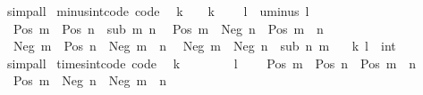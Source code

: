 \begin{isabellebody}
\isamarkupfalse%
\ simp{\isacharunderscore}{\kern0pt}all%
\endisatagproof
{\isafoldproof}%
%
\isadelimproof
\isanewline
%
\endisadelimproof
\isanewline
{}\isamarkupfalse%
\ minus{\isacharunderscore}{\kern0pt}int{\isacharunderscore}{\kern0pt}code\ {\isacharbrackleft}{\kern0pt}code{\isacharbrackright}{\kern0pt}{\isacharcolon}{\kern0pt}\isanewline
\ \ {\isachardoublequoteopen}k\ {\isacharminus}{\kern0pt}\ {}\ {\isacharequal}{\kern0pt}\ k{\isachardoublequoteclose}\isanewline
\ \ {\isachardoublequoteopen}{}\ {\isacharminus}{\kern0pt}\ l\ {\isacharequal}{\kern0pt}\ uminus\ l{\isachardoublequoteclose}\isanewline
\ \ {\isachardoublequoteopen}Pos\ m\ {\isacharminus}{\kern0pt}\ Pos\ n\ {\isacharequal}{\kern0pt}\ sub\ m\ n{\isachardoublequoteclose}\isanewline
\ \ {\isachardoublequoteopen}Pos\ m\ {\isacharminus}{\kern0pt}\ Neg\ n\ {\isacharequal}{\kern0pt}\ Pos\ {\isacharparenleft}{\kern0pt}m\ {\isacharplus}{\kern0pt}\ n{\isacharparenright}{\kern0pt}{\isachardoublequoteclose}\isanewline
\ \ {\isachardoublequoteopen}Neg\ m\ {\isacharminus}{\kern0pt}\ Pos\ n\ {\isacharequal}{\kern0pt}\ Neg\ {\isacharparenleft}{\kern0pt}m\ {\isacharplus}{\kern0pt}\ n{\isacharparenright}{\kern0pt}{\isachardoublequoteclose}\isanewline
\ \ {\isachardoublequoteopen}Neg\ m\ {\isacharminus}{\kern0pt}\ Neg\ n\ {\isacharequal}{\kern0pt}\ sub\ n\ m{\isachardoublequoteclose}\isanewline
\ \ \ k\ l\ {\isacharcolon}{\kern0pt}{\isacharcolon}{\kern0pt}\ int\isanewline
%
\isadelimproof
\ \ %
\endisadelimproof
%
\isatagproof
{}\isamarkupfalse%
\ simp{\isacharunderscore}{\kern0pt}all%
\endisatagproof
{\isafoldproof}%
%
\isadelimproof
\isanewline
%
\endisadelimproof
\isanewline
{}\isamarkupfalse%
\ times{\isacharunderscore}{\kern0pt}int{\isacharunderscore}{\kern0pt}code\ {\isacharbrackleft}{\kern0pt}code{\isacharbrackright}{\kern0pt}{\isacharcolon}{\kern0pt}\isanewline
\ \ {\isachardoublequoteopen}k\ {\isacharasterisk}{\kern0pt}\ {}\ {\isacharequal}{\kern0pt}\ {}{\isachardoublequoteclose}\isanewline
\ \ {\isachardoublequoteopen}{}\ {\isacharasterisk}{\kern0pt}\ l\ {\isacharequal}{\kern0pt}\ {}{\isachardoublequoteclose}\isanewline
\ \ {\isachardoublequoteopen}Pos\ m\ {\isacharasterisk}{\kern0pt}\ Pos\ n\ {\isacharequal}{\kern0pt}\ Pos\ {\isacharparenleft}{\kern0pt}m\ {\isacharasterisk}{\kern0pt}\ n{\isacharparenright}{\kern0pt}{\isachardoublequoteclose}\isanewline
\ \ {\isachardoublequoteopen}Pos\ m\ {\isacharasterisk}{\kern0pt}\ Neg\ n\ {\isacharequal}{\kern0pt}\ Neg\ {\isacharparenleft}{\kern0pt}m\ {\isacharasterisk}{\kern0pt}\ n{\isacharparenright}{\kern0pt}{\isachardoublequoteclose}\isanewline

\end{isabellebody}
